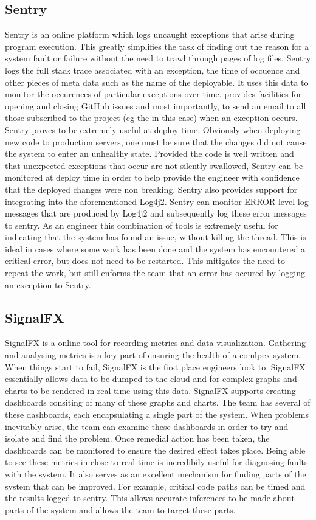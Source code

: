 \subsection{Sentry}
Sentry \cite{sentry} is an online platform which logs uncaught exceptions that arise during program execution. This greatly simplifies the task of finding out the reason for a system fault or failure without the need to trawl through pages of log files. Sentry logs the full stack trace associated with an exception, the time of occuence and other pieces of meta data such as the name of the deployable. It uses this data to monitor the occurences of particular exceptions over time, provides facilities for opening and closing GitHub issues and most importantly, to send an email to all those subscribed to the project (eg the \team{} in this case) when an exception occurs. Sentry proves to be extremely useful at deploy time. Obviously when deploying new code to production servers, one must be sure that the changes did not cause the system to enter an unhealthy state. Provided the code is well written and that unexpected exceptions that occur are not silently swallowed, Sentry can be monitored at deploy time in order to help provide the engineer with confidence that the deployed changes were non breaking. Sentry also provides support for integrating into the aforementioned Log4j2. Sentry can monitor ERROR level log messages that are produced by Log4j2 and subsequently log these error messages to sentry. As an engineer this combination of tools is extremely useful for indicating that the system has found an issue, without killing the thread. This is ideal in cases where some work has been done and the system has encountered a critical error, but does not need to be restarted. This mitigates the need to repeat the work, but still enforms the team that an error has occured by logging an exception to Sentry.

\subsection{SignalFX}
SignalFX \cite{sigfx} is a online tool for recording metrics and data visualization. Gathering and analysing metrics is a key part of ensuring the health of a comlpex system. When things start to fail, SignalFX is the first place engineers look to. SignalFX essentially allows data to be dumped to the cloud and for complex graphs and charts to be rendered in real time using this data. SignalFX supports creating dashboards consiting of many of these graphs and charts. The \team{} team has several of these dashboards, each encapsulating a single part of the system. When problems inevitably arise, the team can examine these dashboards in order to try and isolate and find the problem. Once remedial action has been taken, the dashboards can be monitored to ensure the desired effect takes place. Being able to see these metrics in close to real time is incredibily useful for diagnosing faults with the system. It also serves as an excellent mechanism for finding parts of the system that can be improved. For example, critical code paths can be timed and the results logged to sentry. This allows accurate inferences to be made about parts of the system and allows the team to target these parts.

